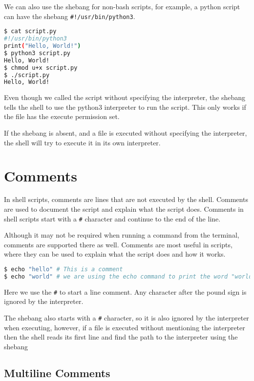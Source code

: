 We can also use the shebang for non-bash scripts, for example, a python script can have the shebang \lstinline{#!/usr/bin/python3}.

\begin{lstlisting}[language=bash]
$ cat script.py
#!/usr/bin/python3
print("Hello, World!")
$ python3 script.py
Hello, World!
$ chmod u+x script.py
$ ./script.py
Hello, World!
\end{lstlisting}

Even though we called the script without specifying the interpreter, the shebang tells the shell to use the python3 interpreter to run the script.
This only works if the file has the execute permission set.

If the shebang is absent, and a file is executed without specifying the interpreter, the shell will try to execute it in its own interpreter.

\section{Comments}

In shell scripts, comments are lines that are not executed by the shell. Comments are used to document the script and explain what the script does. Comments in shell scripts start with a \lstinline{#} character and continue to the end of the line.

Although it may not be required when running a command from the terminal, comments are supported there as well.
Comments are most useful in scripts, where they can be used to explain what the script does and how it works.

\begin{lstlisting}[language=bash]
$ echo "hello" # This is a comment
$ echo "world" # we are using the echo command to print the word "world"
\end{lstlisting}

Here we use the \lstinline{#} to start a line comment. Any character after the pound sign is ignored by the interpreter.

\begin{remark}
    The shebang also starts with a \lstinline{#} character, so it is also ignored by the interpreter when executing, however, if a file is executed without mentioning the interpreter then the shell reads its first line and find the path to the interpreter using the shebang
\end{remark}

\subsection{Multiline Comments}

